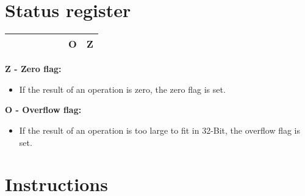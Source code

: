 \documentclass[titlepage]{scrartcl}
\begin{document}
\section{Status register}{
  \renewcommand{\arraystretch}{1.5}
  \begin{tabularx}{\textwidth}{|Y|Y|Y|Y|Y|Y|Y|Y|}
	  \hline
	   &  &  &  &  &  & \textbf{O} & \textbf{Z} \\
	  \hline
  \end{tabularx}
 }

\newcommand{\flagdesc}[3]{
	\hfill \break
	\textbf{#2 - #1 flag:}
	\begin{itemize}
		\item #3
	\end{itemize}
}

\flagdesc{Zero}{Z}{If the result of an operation is zero, the zero flag is set.}
\flagdesc{Overflow}{O}{If the result of an operation is too large to fit in 32-Bit, the overflow flag is set.}
\newpage

\section{Instructions}

\newcommand{\instruction}[9]{
	\subsection{#1 - #2}
	{
		\renewcommand{\arraystretch}{1.5}
		\begin{tabularx}{\textwidth}{XXX}
			\textbf{Description:}     &                   &                          \\
			\multicolumn{3}{>{\hsize=\dimexpr3\hsize+3\tabcolsep}X}{#3}              \\ [1ex]
			\textbf{Operation:}       &                   &                          \\
			\multicolumn{3}{>{\hsize=\dimexpr3\hsize+3\tabcolsep}X}{#4}              \\ [1ex]
			\textbf{Syntax}           & \textbf{Operands} & \textbf{Program counter} \\
			\texttt{#5}               & #6                & #7                       \\ [1ex]
			\textbf{Opcode:}          &                   &                          \\
			\multicolumn{3}{>{\hsize=\dimexpr3\hsize+3\tabcolsep}X}{#8}              \\ [1ex]
			\textbf{Status register:} &                   &                          \\
			\multicolumn{3}{>{\hsize=\dimexpr3\hsize+3\tabcolsep}X}{#9}              \\ [1ex]
		\end{tabularx}
	}
	\newpage
}
\end{document}
